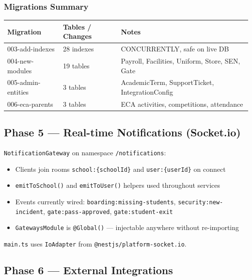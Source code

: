 \documentclass[11pt, a4paper]{article}
\newcommand{\code}[1]{\texttt{\small #1}}
\begin{document}
\subsubsection*{Migrations Summary}

\begin{center}
\begin{tabular}{@{}lll@{}}
  \toprule
  Migration & Tables / Changes & Notes \\
  \midrule
  003-add-indexes & 28 indexes & CONCURRENTLY, safe on live DB \\
  004-new-modules & 19 tables & Payroll, Facilities, Uniform, Store, SEN, Gate \\
  005-admin-entities & 3 tables & AcademicTerm, SupportTicket, IntegrationConfig \\
  006-eca-parents & 3 tables & ECA activities, competitions, attendance \\
  \bottomrule
\end{tabular}
\end{center}

\subsection{Phase 5 --- Real-time Notifications (Socket.io)}

\code{NotificationGateway} on namespace \code{/notifications}:

\begin{itemize}[leftmargin=1.5em, itemsep=0pt]
  \item Clients join rooms \code{school:\{schoolId\}} and \code{user:\{userId\}} on connect
  \item \code{emitToSchool()} and \code{emitToUser()} helpers used throughout services
  \item Events currently wired: \code{boarding:missing-students},
    \code{security:new-incident}, \code{gate:pass-approved}, \code{gate:student-exit}
  \item \code{GatewaysModule} is \code{@Global()} --- injectable anywhere without
    re-importing
\end{itemize}

\code{main.ts} uses \code{IoAdapter} from \code{@nestjs/platform-socket.io}.

\subsection{Phase 6 --- External Integrations}
\end{document}

